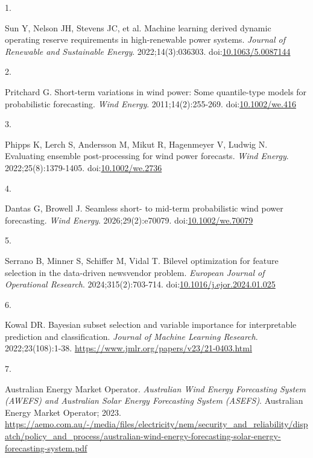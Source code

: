 \documentclass[
  british,
  11pt,
]{article}
\newlength{\cslhangindent}
\newlength{\csllabelwidth}
\newenvironment{CSLReferences}[2] %
 {\begin{list}{}{%
  \setlength{\itemindent}{0pt}
  \setlength{\leftmargin}{0pt}
  \setlength{\parsep}{0pt}
  \ifodd #1
   \setlength{\leftmargin}{\cslhangindent}
   \setlength{\itemindent}{-1\cslhangindent}
  \fi
  \setlength{\itemsep}{#2\baselineskip}}}
 {\end{list}}
\newcommand{\CSLLeftMargin}[1]{\parbox[t]{\csllabelwidth}{\strut#1\strut}}
\newcommand{\CSLRightInline}[1]{\parbox[t]{\linewidth - \csllabelwidth}{\strut#1\strut}}
\begin{document}
\protect{}\label{refs}
\begin{CSLReferences}{0}{1}
\CSLLeftMargin{1. }%
\CSLRightInline{Sun Y, Nelson JH, Stevens JC, et al. Machine learning
derived dynamic operating reserve requirements in high-renewable power
systems. \emph{Journal of Renewable and Sustainable Energy}.
2022;14(3):036303.
doi:\href{https://doi.org/10.1063/5.0087144}{10.1063/5.0087144}}

\CSLLeftMargin{2. }%
\CSLRightInline{Pritchard G. Short-term variations in wind power: Some
quantile-type models for probabilistic forecasting. \emph{Wind Energy}.
2011;14(2):255-269.
doi:\href{https://doi.org/10.1002/we.416}{10.1002/we.416}}

\CSLLeftMargin{3. }%
\CSLRightInline{Phipps K, Lerch S, Andersson M, Mikut R, Hagenmeyer V,
Ludwig N. Evaluating ensemble post-processing for wind power forecasts.
\emph{Wind Energy}. 2022;25(8):1379-1405.
doi:\href{https://doi.org/10.1002/we.2736}{10.1002/we.2736}}

\CSLLeftMargin{4. }%
\CSLRightInline{Dantas G, Browell J. Seamless short- to mid-term
probabilistic wind power forecasting. \emph{Wind Energy}.
2026;29(2):e70079.
doi:\href{https://doi.org/10.1002/we.70079}{10.1002/we.70079}}

\CSLLeftMargin{5. }%
\CSLRightInline{Serrano B, Minner S, Schiffer M, Vidal T. Bilevel
optimization for feature selection in the data-driven newsvendor
problem. \emph{European Journal of Operational Research}.
2024;315(2):703-714.
doi:\href{https://doi.org/10.1016/j.ejor.2024.01.025}{10.1016/j.ejor.2024.01.025}}

\CSLLeftMargin{6. }%
\CSLRightInline{Kowal DR. Bayesian subset selection and variable
importance for interpretable prediction and classification.
\emph{Journal of Machine Learning Research}. 2022;23(108):1-38.
\url{https://www.jmlr.org/papers/v23/21-0403.html}}

\CSLLeftMargin{7. }%
\CSLRightInline{Australian Energy Market Operator. \emph{Australian Wind
Energy Forecasting System ({AWEFS}) and Australian Solar Energy
Forecasting System ({ASEFS})}. Australian Energy Market Operator; 2023.
\url{https://aemo.com.au/-/media/files/electricity/nem/security_and_reliability/dispatch/policy_and_process/australian-wind-energy-forecasting-solar-energy-forecasting-system.pdf}}


\end{CSLReferences}
\end{document}

